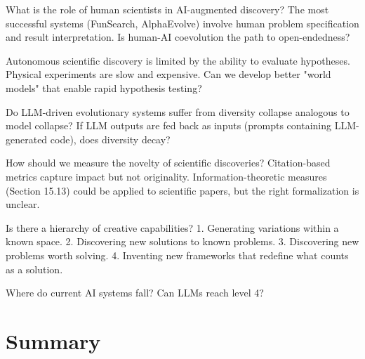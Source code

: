 \begin{question}
What is the role of human scientists in AI-augmented discovery? The most successful systems (FunSearch, AlphaEvolve) involve human problem specification and result interpretation. Is human-AI coevolution the path to open-endedness?
\end{question}

\begin{question}
Autonomous scientific discovery is limited by the ability to evaluate hypotheses. Physical experiments are slow and expensive. Can we develop better "world models" that enable rapid hypothesis testing?
\end{question}

\begin{question}
Do LLM-driven evolutionary systems suffer from diversity collapse analogous to model collapse? If LLM outputs are fed back as inputs (prompts containing LLM-generated code), does diversity decay?
\end{question}

\begin{question}
How should we measure the novelty of scientific discoveries? Citation-based metrics capture impact but not originality. Information-theoretic measures (Section 15.13) could be applied to scientific papers, but the right formalization is unclear.
\end{question}

\begin{question}
Is there a hierarchy of creative capabilities?
1. Generating variations within a known space.
2. Discovering new solutions to known problems.
3. Discovering new problems worth solving.
4. Inventing new frameworks that redefine what counts as a solution.

Where do current AI systems fall? Can LLMs reach level 4?
\end{question}



\section{Summary}


